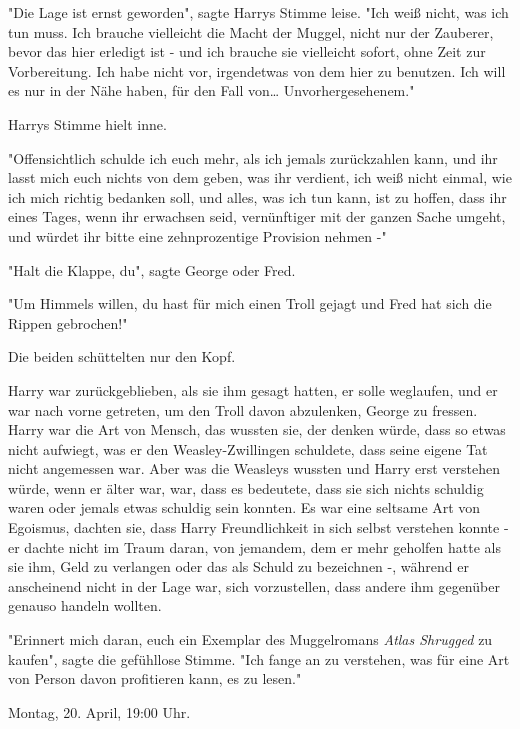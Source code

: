 {"Die Lage ist ernst geworden", sagte Harrys Stimme leise. "Ich weiß nicht, was ich tun muss. Ich brauche vielleicht die Macht der Muggel, nicht nur der Zauberer, bevor das hier erledigt ist - und ich brauche sie vielleicht sofort, ohne Zeit zur Vorbereitung. Ich habe nicht vor, irgendetwas von dem hier zu benutzen. Ich will es nur in der Nähe haben, für den Fall von… Unvorhergesehenem."

Harrys Stimme hielt inne.

"Offensichtlich schulde ich euch mehr, als ich jemals zurückzahlen kann, und ihr lasst mich euch nichts von dem geben, was ihr verdient, ich weiß nicht einmal, wie ich mich richtig bedanken soll, und alles, was ich tun kann, ist zu hoffen, dass ihr eines Tages, wenn ihr erwachsen seid, vernünftiger mit der ganzen Sache umgeht, und würdet ihr bitte eine zehnprozentige Provision nehmen -"

"Halt die Klappe, du", sagte George oder Fred.

"Um Himmels willen, du hast für mich einen Troll gejagt und Fred hat sich die Rippen gebrochen!"

Die beiden schüttelten nur den Kopf.

Harry war zurückgeblieben, als sie ihm gesagt hatten, er solle weglaufen, und er war nach vorne getreten, um den Troll davon abzulenken, George zu fressen. Harry war die Art von Mensch, das wussten sie, der denken würde, dass so etwas nicht aufwiegt, was er den Weasley-Zwillingen schuldete, dass seine eigene Tat nicht angemessen war. Aber was die Weasleys wussten und Harry erst verstehen würde, wenn er älter war, war, dass es bedeutete, dass sie sich nichts schuldig waren oder jemals etwas schuldig sein konnten. Es war eine seltsame Art von Egoismus, dachten sie, dass Harry Freundlichkeit in sich selbst verstehen konnte - er dachte nicht im Traum daran, von jemandem, dem er mehr geholfen hatte als sie ihm, Geld zu verlangen oder das als Schuld zu bezeichnen -, während er anscheinend nicht in der Lage war, sich vorzustellen, dass andere ihm gegenüber genauso handeln wollten.

"Erinnert mich daran, euch ein Exemplar des Muggelromans \emph{Atlas Shrugged} zu kaufen", sagte die gefühllose Stimme. "Ich fange an zu verstehen, was für eine Art von Person davon profitieren kann, es zu lesen."

Montag, 20. April, 19:00 Uhr.

}
